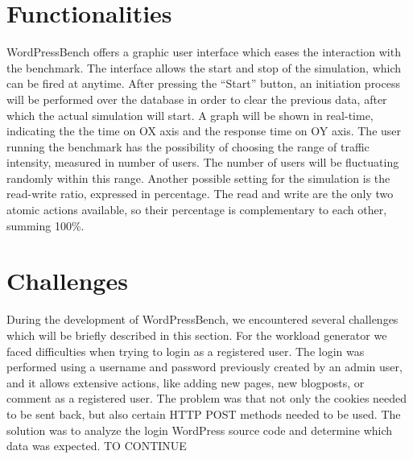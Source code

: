 \section{Functionalities}
\label{sec:functionalities}

WordPressBench offers a graphic user interface which eases the interaction with the benchmark. The interface allows the start and stop of the simulation, which can be fired at anytime. After pressing the “Start” button, an initiation process will be performed over the database in order to clear the previous data, after which the actual simulation will start. A graph will be shown in real-time, indicating the the time on OX axis and the response time on OY axis. The user running the benchmark has the possibility of choosing the range of  traffic intensity, measured in number of users. The number of users will be fluctuating randomly within this range. Another possible setting for the simulation is the read-write ratio, expressed in percentage. The read and write are the only two atomic actions available, so their percentage is complementary to each other, summing 100\%.

\section{Challenges}
\label{sec:challenges}

During the development of WordPressBench, we encountered several challenges which will be briefly described in this section. For the workload generator we faced difficulties when trying to login as a registered user. The login was performed using a username and password previously created by an admin user, and it allows extensive actions, like adding new pages, new blogposts, or comment as a registered user. The problem was that not only the cookies needed to be sent back, but also certain HTTP POST methods needed to be used. The solution was to analyze the login WordPress source code and determine which data was expected. TO CONTINUE
